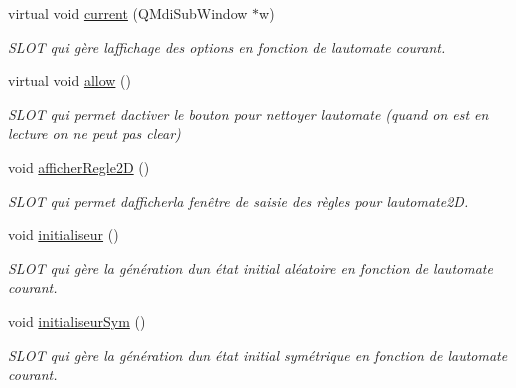 \begin{DoxyCompactItemize}
virtual void \hyperlink{class_main_window_a83229b428a4774bf75bebfb6a1ae2bfe}{current} (Q\+Mdi\+Sub\+Window $\ast$w)
\begin{DoxyCompactList}\small\item\em S\+L\+OT qui gère l\textquotesingle{}affichage des options en fonction de l\textquotesingle{}automate courant. \end{DoxyCompactList}\item 
virtual void \hyperlink{class_main_window_a9a12b2903cb870b374af5f0ab8df7bda}{allow} ()
\begin{DoxyCompactList}\small\item\em S\+L\+OT qui permet d\textquotesingle{}activer le bouton pour nettoyer l\textquotesingle{}automate (quand on est en lecture on ne peut pas clear) \end{DoxyCompactList}\item 
void \hyperlink{class_main_window_ab14d52a2b2a63b6ed930e4131322dd3d}{afficher\+Regle2D} ()
\begin{DoxyCompactList}\small\item\em S\+L\+OT qui permet d\textquotesingle{}afficherla fenêtre de saisie des règles pour l\textquotesingle{}automate2D. \end{DoxyCompactList}\item 
void \hyperlink{class_main_window_a2ee1589220ee377441d94777ccef6c9f}{initialiseur} ()
\begin{DoxyCompactList}\small\item\em S\+L\+OT qui gère la génération d\textquotesingle{}un état initial aléatoire en fonction de l\textquotesingle{}automate courant. \end{DoxyCompactList}\item 
void \hyperlink{class_main_window_a611ef20ef8820089fe62ea686f321456}{initialiseur\+Sym} ()
\begin{DoxyCompactList}\small\item\em S\+L\+OT qui gère la génération d\textquotesingle{}un état initial symétrique en fonction de l\textquotesingle{}automate courant. \end{DoxyCompactList}\end{DoxyCompactItemize}
